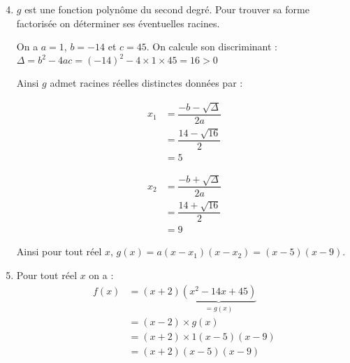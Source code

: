 \documentclass[15pt, mathserif]{beamer}
\begin{document}
 \begin{frame} 
 \begin{enumerate} 
 \setcounter{enumi}{3} 
 	\item $g$ est une fonction polynôme du second degré. Pour trouver sa forme factorisée on déterminer ses éventuelles racines.
 
 On a $a=1$, $b=-14$ et $c=45$. On calcule son discriminant : \hfil $\Delta=b^2-4ac= \left(-14\right)^2 -4 \times 1 \times 45= 16 >0$ 
 
 Ainsi $g$ admet racines réelles distinctes données par : \begin{minipage}{0.45\linewidth} 
 \begin{align*} 
 x_1 &= \dfrac{-b-\sqrt{\Delta}}{2a} \\ 
 &= \dfrac{14-\sqrt{16}}{2} \\ 
 &= 5\end{align*} 
 \end{minipage} 
 \hfil \begin{minipage}{0.45\linewidth} 
 \begin{align*}x_2 &= \dfrac{-b+\sqrt{\Delta}}{2a} \\ 
 &= \dfrac{14+\sqrt{16}}{2} \\ 
 &= 9
 \end{align*} 
 \end{minipage} 
 
 Ainsi pour tout réel $x$, $g(x)=a(x-x_1)(x-x_2)= \left(x-5\right)\left(x-9 \right)$. 
 \end{enumerate}
 \end{frame} 
 \begin{frame} 
 \begin{enumerate} 
 \setcounter{enumi}{4} 
 	 \item Pour tout réel $x$ on a :
 \begin{align*} 
 f(x)&=(x+2)\underbrace{(x^2-14x+45)}_{=g(x)} \\ 
   &= (x-2) \times g(x) \\ 
  &= (x+2) \times 1\left(x-5\right)\left(x-9 \right) \\ 
 &= (x+2)\left(x-5\right)\left(x-9 \right)
   \end{align*}
 \end{enumerate} 
 
 \end{frame}
\end{document}
